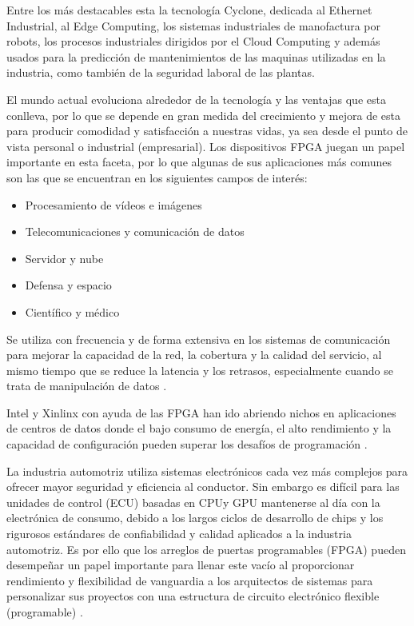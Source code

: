 \documentclass[journal]{IEEEtran}
\begin{document}
	Entre los más destacables esta la tecnología Cyclone, dedicada al Ethernet Industrial, al Edge Computing, los sistemas industriales de manofactura por robots, los procesos industriales dirigidos por el Cloud Computing y además usados para la predicción de mantenimientos de las maquinas utilizadas en la industria, como también de la seguridad laboral de las plantas. 
	
	\vspace{4mm}
	
	El mundo actual evoluciona alrededor de la tecnología y las ventajas que esta conlleva, por lo que se depende en gran medida del crecimiento y mejora de esta para producir comodidad y satisfacción a nuestras vidas, ya sea desde el punto de vista personal o industrial (empresarial). Los dispositivos FPGA juegan un papel importante en esta faceta, por lo que algunas de sus aplicaciones más comunes son las que se encuentran en los siguientes campos de interés:
	
	\begin{itemize}
		\item Procesamiento de vídeos e imágenes
		\item Telecomunicaciones y comunicación de datos
		\item Servidor y nube 
		\item Defensa y espacio
		\item Científico y médico
	\end{itemize}
	
	Se utiliza con frecuencia y de forma extensiva en los sistemas de comunicación para mejorar la capacidad de la red, la cobertura y la calidad del servicio, al mismo tiempo que se reduce la latencia y los retrasos, especialmente cuando se trata de manipulación de datos \cite{HardwareBee}. 
	
	Intel y Xinlinx con ayuda de las FPGA han ido abriendo nichos en aplicaciones de centros de datos donde el bajo consumo de energía, el alto rendimiento y la capacidad de configuración pueden superar los desafíos de programación \cite{Freund2018}.
	
	La industria automotriz utiliza sistemas electrónicos cada vez más complejos para ofrecer mayor seguridad y eficiencia al conductor. Sin embargo es difícil para las unidades de control (ECU) basadas en CPUy GPU mantenerse al día con la electrónica de consumo, debido a los largos ciclos de desarrollo de chips y los rigurosos estándares de confiabilidad y calidad aplicados a la industria automotriz. Es por ello que los arreglos de puertas programables (FPGA) pueden desempeñar un papel importante para llenar este vacío al proporcionar rendimiento y flexibilidad de vanguardia a los arquitectos de sistemas para personalizar sus proyectos con una estructura de circuito electrónico flexible (programable) \cite{Emilio2017}.
	
\end{document}

